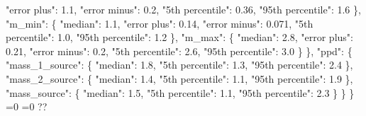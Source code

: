{{          "error plus": 1.1, %
          "error minus": 0.2, %
          "5th percentile": 0.36, %
          "95th percentile": 1.6%
        \}, %
        "m\_min": \{%
          "median": 1.1, %
          "error plus": 0.14, %
          "error minus": 0.071, %
          "5th percentile": 1.0, %
          "95th percentile": 1.2%
        \}, %
        "m\_max": \{%
          "median": 2.8, %
          "error plus": 0.21, %
          "error minus": 0.2, %
          "5th percentile": 2.6, %
          "95th percentile": 3.0%
        \}%
      \}, %
      "ppd": \{%
        "mass\_1\_source": \{%
          "median": 1.8, %
          "5th percentile": 1.3, %
          "95th percentile": 2.4%
        \}, %
        "mass\_2\_source": \{%
          "median": 1.4, %
          "5th percentile": 1.1, %
          "95th percentile": 1.9%
        \}, %
        "mass\_source": \{%
          "median": 1.5, %
          "5th percentile": 1.1, %
          "95th percentile": 2.3%
        \}%
      \}%
    \}}%
  \else%
    \ifnum{}=0%
      \let\peakcutsodapop@II@out\peakcutsodapop@V%
    \else%
      \ifnum{}=0%
      \let\peakcutsodapop@II@out\peakcutsodapop@VI%
    \else%
      \def\peakcutsodapop@II@out{%
    ??}%
    \fi\fi
  \fi
  \peakcutsodapop@II@out
}\newcommand\peakcutsodapop@III[1][all]{%
  \ifnum\pdfstrcmp{#1}{all}=0%
    \def\peakcutsodapop@III@out{%
    \{%
      "mu": \{%
        "median": 1.4, %
        "error plus": 0.45, %
        "error minus": 0.24, %
        "5th percentile": 1.1, %
        "95th percentile": 1.8%
      \}, %
      "sigma": \{%
        "median": 0.65, %
        "error plus": 1.2, %
        "error minus": 0.42, %
        "5th percentile": 0.23, %
        "95th percentile": 1.9%
      \}, %
      "m\_min": \{%
        "median": 1.1, %
        "error plus": 0.15, %
        "error minus": 0.093, %
        "5th percentile": 1.0, %
        "95th percentile": 1.3%
      \}, %
      "m\_max": \{%
        "median": 2.0, %
        "error plus": 0.87, %
        "error minus": 0.18, %
        "5th percentile": 1.8, %
        "95th percentile": 2.8%
      \}%
    \}}%
  \else%
    \ifnum\pdfstrcmp{#1}{mu}=0%
      \let\peakcutsodapop@III@out\peakcutsodapop@VII%
    \else%
      \ifnum\pdfstrcmp{#1}{sigma}=0%
      \let\peakcutsodapop@III@out\peakcutsodapop@VIII%
    \else%
      \ifnum\pdfstrcmp{#1}{m_min}=0%
      \let\peakcutsodapop@III@out\peakcutsodapop@IX%
    \else%
      \ifnum\pdfstrcmp{#1}{m_max}=0%
      \let\peakcutsodapop@III@out\peakcutsodapop@X%
    \else%
      \def\peakcutsodapop@III@out{%
    ??}%
}
